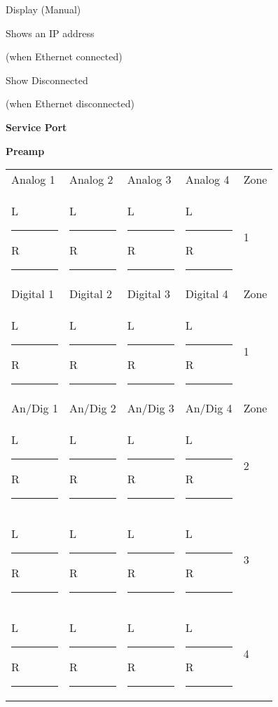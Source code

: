 \documentclass{article}
\begin{document}
\begin{minipage}[t]{0.44\textwidth}
  \begin{checklist}
    \item Display (Manual)
    \begin{checklist}
      \item Shows an IP address \item[] (when Ethernet connected)
      \item Show Disconnected \item[] (when Ethernet disconnected)
    \end{checklist}
    \item \textbf{Service Port}
  \end{checklist}
\end{minipage}
\hspace{0.03\textwidth}
\begin{minipage}[t]{0.52\textwidth}
  \begin{checklist}
    \item \textbf{Preamp}
  \end{checklist}
  {\renewcommand{\arraystretch}{1.5} %
  \begin{tabularx}{\linewidth}{XXXXX}
    Analog 1 & Analog 2 & Analog 3 & Analog 4 & Zone \\
    L\rule{1.4em}{0.4pt} R\rule{1.4em}{0.4pt} & L\rule{1.4em}{0.4pt} R\rule{1.4em}{0.4pt} &
      L\rule{1.4em}{0.4pt} R\rule{1.4em}{0.4pt} & L\rule{1.4em}{0.4pt} R\rule{1.4em}{0.4pt} & 1 \\
    Digital 1 & Digital 2 & Digital 3 & Digital 4 & Zone \\
    L\rule{1.4em}{0.4pt} R\rule{1.4em}{0.4pt} & L\rule{1.4em}{0.4pt} R\rule{1.4em}{0.4pt} &
      L\rule{1.4em}{0.4pt} R\rule{1.4em}{0.4pt} & L\rule{1.4em}{0.4pt} R\rule{1.4em}{0.4pt} & 1 \\
    An/Dig 1 & An/Dig 2 & An/Dig 3 & An/Dig 4 & Zone \\
    L\rule{1.4em}{0.4pt} R\rule{1.4em}{0.4pt} & L\rule{1.4em}{0.4pt} R\rule{1.4em}{0.4pt} &
      L\rule{1.4em}{0.4pt} R\rule{1.4em}{0.4pt} & L\rule{1.4em}{0.4pt} R\rule{1.4em}{0.4pt} & 2 \\
    L\rule{1.4em}{0.4pt} R\rule{1.4em}{0.4pt} & L\rule{1.4em}{0.4pt} R\rule{1.4em}{0.4pt} &
      L\rule{1.4em}{0.4pt} R\rule{1.4em}{0.4pt} & L\rule{1.4em}{0.4pt} R\rule{1.4em}{0.4pt} & 3 \\
    L\rule{1.4em}{0.4pt} R\rule{1.4em}{0.4pt} & L\rule{1.4em}{0.4pt} R\rule{1.4em}{0.4pt} &
      L\rule{1.4em}{0.4pt} R\rule{1.4em}{0.4pt} & L\rule{1.4em}{0.4pt} R\rule{1.4em}{0.4pt} & 4 \\

\end{tabularx}}
\end{minipage}
\end{document}
